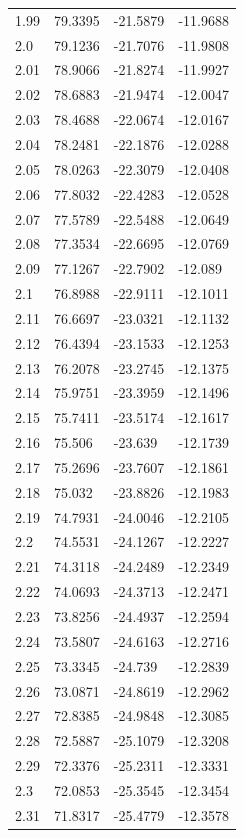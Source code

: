 \begin{tabular}{llll}
1.99 & 79.3395 & -21.5879 & -11.9688 \\
2.0 & 79.1236 & -21.7076 & -11.9808 \\
2.01 & 78.9066 & -21.8274 & -11.9927 \\
2.02 & 78.6883 & -21.9474 & -12.0047 \\
2.03 & 78.4688 & -22.0674 & -12.0167 \\
2.04 & 78.2481 & -22.1876 & -12.0288 \\
2.05 & 78.0263 & -22.3079 & -12.0408 \\
2.06 & 77.8032 & -22.4283 & -12.0528 \\
2.07 & 77.5789 & -22.5488 & -12.0649 \\
2.08 & 77.3534 & -22.6695 & -12.0769 \\
2.09 & 77.1267 & -22.7902 & -12.089 \\
2.1 & 76.8988 & -22.9111 & -12.1011 \\
2.11 & 76.6697 & -23.0321 & -12.1132 \\
2.12 & 76.4394 & -23.1533 & -12.1253 \\
2.13 & 76.2078 & -23.2745 & -12.1375 \\
2.14 & 75.9751 & -23.3959 & -12.1496 \\
2.15 & 75.7411 & -23.5174 & -12.1617 \\
2.16 & 75.506 & -23.639 & -12.1739 \\
2.17 & 75.2696 & -23.7607 & -12.1861 \\
2.18 & 75.032 & -23.8826 & -12.1983 \\
2.19 & 74.7931 & -24.0046 & -12.2105 \\
2.2 & 74.5531 & -24.1267 & -12.2227 \\
2.21 & 74.3118 & -24.2489 & -12.2349 \\
2.22 & 74.0693 & -24.3713 & -12.2471 \\
2.23 & 73.8256 & -24.4937 & -12.2594 \\
2.24 & 73.5807 & -24.6163 & -12.2716 \\
2.25 & 73.3345 & -24.739 & -12.2839 \\
2.26 & 73.0871 & -24.8619 & -12.2962 \\
2.27 & 72.8385 & -24.9848 & -12.3085 \\
2.28 & 72.5887 & -25.1079 & -12.3208 \\
2.29 & 72.3376 & -25.2311 & -12.3331 \\
2.3 & 72.0853 & -25.3545 & -12.3454 \\
2.31 & 71.8317 & -25.4779 & -12.3578 \\

\end{tabular}
